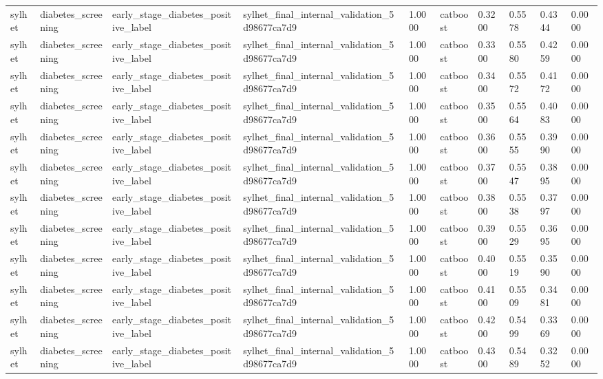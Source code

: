 \begin{tabular}{llllllllll}
sylhet & diabetes\_screening & early\_stage\_diabetes\_positive\_label & sylhet\_final\_internal\_validation\_5d98677ca7d9 & 1.0000 & catboost & 0.3200 & 0.5578 & 0.4344 & 0.0000 \\
sylhet & diabetes\_screening & early\_stage\_diabetes\_positive\_label & sylhet\_final\_internal\_validation\_5d98677ca7d9 & 1.0000 & catboost & 0.3300 & 0.5580 & 0.4259 & 0.0000 \\
sylhet & diabetes\_screening & early\_stage\_diabetes\_positive\_label & sylhet\_final\_internal\_validation\_5d98677ca7d9 & 1.0000 & catboost & 0.3400 & 0.5572 & 0.4172 & 0.0000 \\
sylhet & diabetes\_screening & early\_stage\_diabetes\_positive\_label & sylhet\_final\_internal\_validation\_5d98677ca7d9 & 1.0000 & catboost & 0.3500 & 0.5564 & 0.4083 & 0.0000 \\
sylhet & diabetes\_screening & early\_stage\_diabetes\_positive\_label & sylhet\_final\_internal\_validation\_5d98677ca7d9 & 1.0000 & catboost & 0.3600 & 0.5555 & 0.3990 & 0.0000 \\
sylhet & diabetes\_screening & early\_stage\_diabetes\_positive\_label & sylhet\_final\_internal\_validation\_5d98677ca7d9 & 1.0000 & catboost & 0.3700 & 0.5547 & 0.3895 & 0.0000 \\
sylhet & diabetes\_screening & early\_stage\_diabetes\_positive\_label & sylhet\_final\_internal\_validation\_5d98677ca7d9 & 1.0000 & catboost & 0.3800 & 0.5538 & 0.3797 & 0.0000 \\
sylhet & diabetes\_screening & early\_stage\_diabetes\_positive\_label & sylhet\_final\_internal\_validation\_5d98677ca7d9 & 1.0000 & catboost & 0.3900 & 0.5529 & 0.3695 & 0.0000 \\
sylhet & diabetes\_screening & early\_stage\_diabetes\_positive\_label & sylhet\_final\_internal\_validation\_5d98677ca7d9 & 1.0000 & catboost & 0.4000 & 0.5519 & 0.3590 & 0.0000 \\
sylhet & diabetes\_screening & early\_stage\_diabetes\_positive\_label & sylhet\_final\_internal\_validation\_5d98677ca7d9 & 1.0000 & catboost & 0.4100 & 0.5509 & 0.3481 & 0.0000 \\
sylhet & diabetes\_screening & early\_stage\_diabetes\_positive\_label & sylhet\_final\_internal\_validation\_5d98677ca7d9 & 1.0000 & catboost & 0.4200 & 0.5499 & 0.3369 & 0.0000 \\
sylhet & diabetes\_screening & early\_stage\_diabetes\_positive\_label & sylhet\_final\_internal\_validation\_5d98677ca7d9 & 1.0000 & catboost & 0.4300 & 0.5489 & 0.3252 & 0.0000 \\

\end{tabular}
